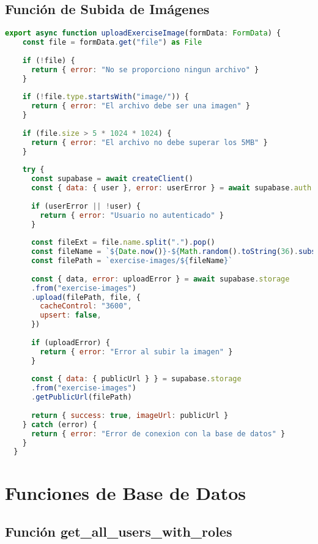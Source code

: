 \documentclass[12pt,a4paper]{article}
\begin{document}
\subsection{Función de Subida de Imágenes}

\begin{lstlisting}[language=JavaScript, caption=Función uploadExerciseImage]
  export async function uploadExerciseImage(formData: FormData) {
    const file = formData.get("file") as File
    
    if (!file) {
      return { error: "No se proporciono ningun archivo" }
    }
    
    if (!file.type.startsWith("image/")) {
      return { error: "El archivo debe ser una imagen" }
    }
    
    if (file.size > 5 * 1024 * 1024) {
      return { error: "El archivo no debe superar los 5MB" }
    }
    
    try {
      const supabase = await createClient()
      const { data: { user }, error: userError } = await supabase.auth.getUser()
      
      if (userError || !user) {
        return { error: "Usuario no autenticado" }
      }
      
      const fileExt = file.name.split(".").pop()
      const fileName = `${Date.now()}-${Math.random().toString(36).substring(7)}.${fileExt}`
      const filePath = `exercise-images/${fileName}`
      
      const { data, error: uploadError } = await supabase.storage
      .from("exercise-images")
      .upload(filePath, file, {
        cacheControl: "3600",
        upsert: false,
      })
      
      if (uploadError) {
        return { error: "Error al subir la imagen" }
      }
      
      const { data: { publicUrl } } = supabase.storage
      .from("exercise-images")
      .getPublicUrl(filePath)
      
      return { success: true, imageUrl: publicUrl }
    } catch (error) {
      return { error: "Error de conexion con la base de datos" }
    }
  }
\end{lstlisting}

\section{Funciones de Base de Datos}

\subsection{Función get\_all\_users\_with\_roles}
\end{document}
